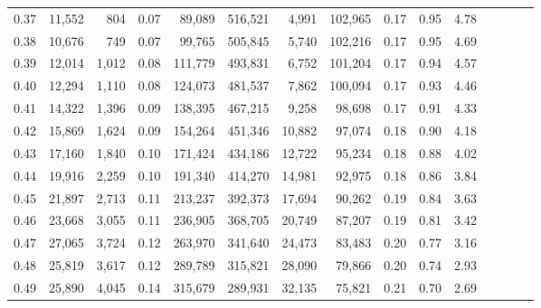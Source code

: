 \begin{tabular}{rrrcrrrrrrrrrrr}
0.37 &  11,552 &    804 &                                       0.07 &   89,089 &  516,521 &    4,991 &  102,965 &  0.17 &  0.95 &                         4.78 \\
0.38 &  10,676 &    749 &                                       0.07 &   99,765 &  505,845 &    5,740 &  102,216 &  0.17 &  0.95 &                         4.69 \\
0.39 &  12,014 &  1,012 &                                       0.08 &  111,779 &  493,831 &    6,752 &  101,204 &  0.17 &  0.94 &                         4.57 \\
0.40 &  12,294 &  1,110 &                                       0.08 &  124,073 &  481,537 &    7,862 &  100,094 &  0.17 &  0.93 &                         4.46 \\
0.41 &  14,322 &  1,396 &                                       0.09 &  138,395 &  467,215 &    9,258 &   98,698 &  0.17 &  0.91 &                         4.33 \\
0.42 &  15,869 &  1,624 &                                       0.09 &  154,264 &  451,346 &   10,882 &   97,074 &  0.18 &  0.90 &                         4.18 \\
0.43 &  17,160 &  1,840 &                                       0.10 &  171,424 &  434,186 &   12,722 &   95,234 &  0.18 &  0.88 &                         4.02 \\
0.44 &  19,916 &  2,259 &                                       0.10 &  191,340 &  414,270 &   14,981 &   92,975 &  0.18 &  0.86 &                         3.84 \\
0.45 &  21,897 &  2,713 &                                       0.11 &  213,237 &  392,373 &   17,694 &   90,262 &  0.19 &  0.84 &                         3.63 \\
0.46 &  23,668 &  3,055 &                                       0.11 &  236,905 &  368,705 &   20,749 &   87,207 &  0.19 &  0.81 &                         3.42 \\
0.47 &  27,065 &  3,724 &                                       0.12 &  263,970 &  341,640 &   24,473 &   83,483 &  0.20 &  0.77 &                         3.16 \\
0.48 &  25,819 &  3,617 &                                       0.12 &  289,789 &  315,821 &   28,090 &   79,866 &  0.20 &  0.74 &                         2.93 \\
0.49 &  25,890 &  4,045 &                                       0.14 &  315,679 &  289,931 &   32,135 &   75,821 &  0.21 &  0.70 &                         2.69 \\

\end{tabular}
